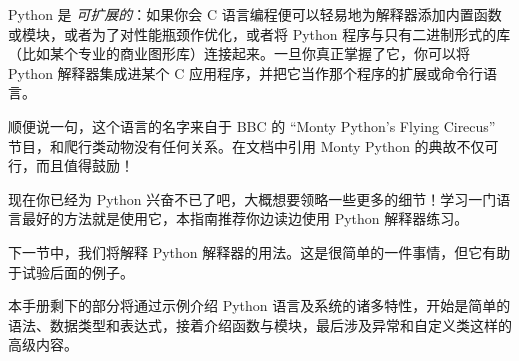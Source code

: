 Python 是 \emph{可扩展的}：如果你会 C 语言编程便可以轻易地为解释器添加内置函数或模块，或者为了对性能瓶颈作优化，或者将 Python 程序与只有二进制形式的库（比如某个专业的商业图形库）连接起来。一旦你真正掌握了它，你可以将 Python 解释器集成进某个 C 应用程序，并把它当作那个程序的扩展或命令行语言。

顺便说一句，这个语言的名字来自于 BBC 的 “Monty Python's Flying Cirecus” 节目，和爬行类动物没有任何关系。在文档中引用 Monty Python 的典故不仅可行，而且值得鼓励！

现在你已经为 Python 兴奋不已了吧，大概想要领略一些更多的细节！学习一门语言最好的方法就是使用它，本指南推荐你边读边使用 Python 解释器练习。

下一节中，我们将解释 Python 解释器的用法。这是很简单的一件事情，但它有助于试验后面的例子。

本手册剩下的部分将通过示例介绍 Python 语言及系统的诸多特性，开始是简单的语法、数据类型和表达式，接着介绍函数与模块，最后涉及异常和自定义类这样的高级内容。
